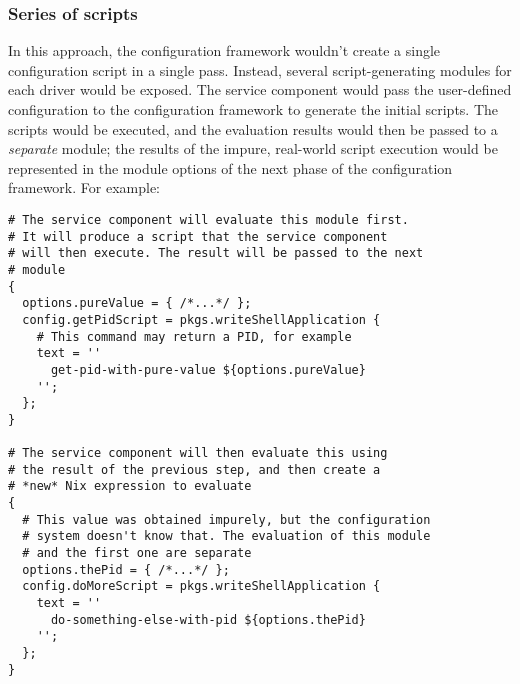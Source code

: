 \documentclass[11pt]{article}
\begin{document}
\subsubsection*{Series of scripts}
\label{sec:org7981a44}
In this approach, the configuration framework wouldn't create a single configuration script in a single pass. Instead, several script-generating modules for each driver would be exposed. The service component would pass the user-defined configuration to the configuration framework to generate the initial scripts. The scripts would be executed, and the evaluation results would then be passed to a \emph{separate} module; the results of the impure, real-world script execution would be represented in the module options of the next phase of the configuration framework. For example:
\lstset{language=nix,label= ,caption= ,captionpos=b,numbers=none}
\begin{lstlisting}
# The service component will evaluate this module first.
# It will produce a script that the service component
# will then execute. The result will be passed to the next
# module
{
  options.pureValue = { /*...*/ };
  config.getPidScript = pkgs.writeShellApplication {
    # This command may return a PID, for example
    text = ''
      get-pid-with-pure-value ${options.pureValue}
    '';
  };
}

# The service component will then evaluate this using
# the result of the previous step, and then create a
# *new* Nix expression to evaluate
{
  # This value was obtained impurely, but the configuration
  # system doesn't know that. The evaluation of this module
  # and the first one are separate
  options.thePid = { /*...*/ };
  config.doMoreScript = pkgs.writeShellApplication {
    text = ''
      do-something-else-with-pid ${options.thePid}
    '';
  };
}
\end{lstlisting}
\end{document}

